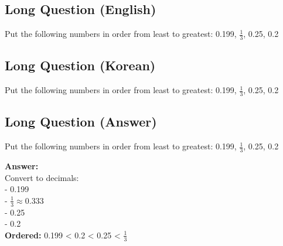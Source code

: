 \cleardoublepage
\subsection*{Long Question (English)}
Put the following numbers in order from least to greatest: 0.199, $\frac{1}{3}$, 0.25, 0.2


\newpage
\subsection*{Long Question (Korean)}
Put the following numbers in order from least to greatest: 0.199, $\frac{1}{3}$, 0.25, 0.2


\newpage
\subsection*{Long Question (Answer)}
Put the following numbers in order from least to greatest: 0.199, $\frac{1}{3}$, 0.25, 0.2

\textbf{Answer:}\\
Convert to decimals:\\
- 0.199\\
- $\frac{1}{3} \approx 0.333$\\
- 0.25\\
- 0.2\\
\textbf{Ordered:} 0.199 < 0.2 < 0.25 < $\frac{1}{3}$
